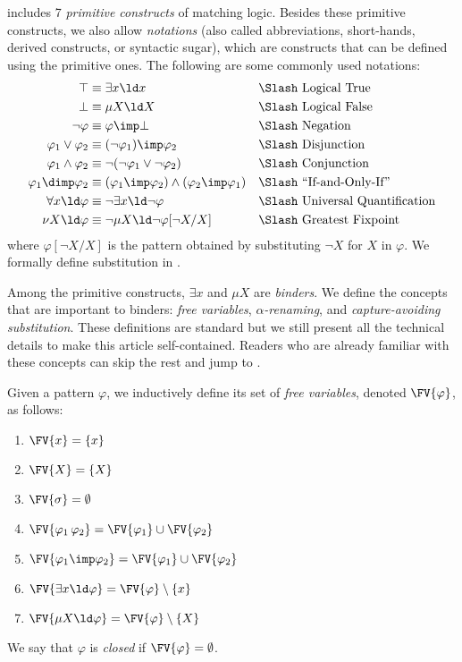\documentclass{article}
\begin{document}
 includes 7 \emph{primitive constructs} of matching logic.
Besides these primitive constructs, we also allow \emph{notations}
(also called
abbreviations, short-hands, derived constructs, or syntactic sugar),
which are constructs that can be defined using the primitive ones.
The following are some commonly used notations:
\begin{align}
\top
&\equiv \exists x \ld x
&&\text{\Slash Logical True}
\\
\bot
&\equiv \mu X \ld X
&&\text{\Slash Logical False}
\\
\neg \varphi
&\equiv \varphi \imp \bot
&&\text{\Slash Negation}
\\
\varphi_1 \lor \varphi_2
&\equiv (\neg \varphi_1) \imp \varphi_2
&&\text{\Slash Disjunction}
\\
\varphi_1 \land \varphi_2
&\equiv \neg(\neg \varphi_1 \lor \neg \varphi_2)
&&\text{\Slash Conjunction}
\\
\varphi_1 \dimp \varphi_2
&\equiv (\varphi_1 \imp \varphi_2) \land (\varphi_2 \imp \varphi_1)
&&\text{\Slash ``If-and-Only-If''}
\\
\forall x \ld \varphi
&\equiv \neg \exists x \ld \neg \varphi
&&\text{\Slash Universal Quantification}
\\
\nu X \ld \varphi
&\equiv \neg \mu X \ld \neg \varphi[\neg X / X]
&&\text{\Slash Greatest Fixpoint}
\end{align}
where $\varphi[\neg X / X]$ is the pattern obtained by
substituting $\neg X$ for $X$ in $\varphi$.
We formally define substitution in .



Among the primitive constructs, $\exists x$ and $\mu X$ are \emph{binders}.
We define the concepts that are important to binders:
\emph{free variables}, \emph{$\alpha$-renaming}, and
\emph{capture-avoiding substitution}.
These definitions are standard
but we still present all the technical details to make this article
self-contained.
Readers who are already familiar with these concepts can skip
the rest and jump to .

\begin{definition}
Given a pattern $\varphi$,
we inductively
define its set of \emph{free variables}, denoted $\FV{\varphi}$, as follows:
\begin{enumerate}
\item $\FV{x} = \{x\}$
\item $\FV{X} = \{X\}$
\item $\FV{\sigma} = \emptyset$
\item $\FV{\varphi_1 \, \varphi_2} = \FV{\varphi_1} \cup \FV{\varphi_2}$
\item $\FV{\varphi_1 \imp \varphi_2} = \FV{\varphi_1} \cup \FV{\varphi_2}$
\item $\FV{\exists x \ld \varphi} = \FV{\varphi} \setminus \{x\}$
\item $\FV{\mu X \ld \varphi} = \FV{\varphi} \setminus \{X\}$
\end{enumerate}
We say that $\varphi$ is \emph{closed} if $\FV{\varphi} = \emptyset$.
\end{definition}
\end{document}
